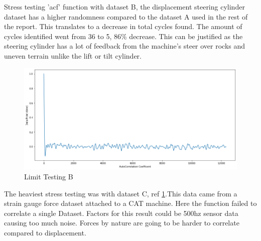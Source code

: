 Stress testing 'acf' function with dataset B, the displacement steering cylinder dataset has a higher randomness compared to the dataset A used in the rest of the report. This translates to a decrease in total cycles found. The amount of cycles identified went from 36 to 5, 86\% decrease. 
This can be justified as the steering cylinder has a lot of feedback from the machine's steer over rocks and uneven terrain unlike the lift or tilt cylinder.

\begin{figure}[h]
\centering
\includegraphics[scale=0.40]{images/limitTestB.png}
\caption{Limit Testing B }
\label{LimitB}
\end{figure}
The heaviest stress testing was with dataset C, ref \ref{LimitB}.This data came from a strain gauge force dataset attached to a CAT machine. Here the function failed to correlate a single Dataset. Factors for this result could be 500hz sensor data causing too much noise. Forces by nature are going to be harder to correlate compared to displacement. 
